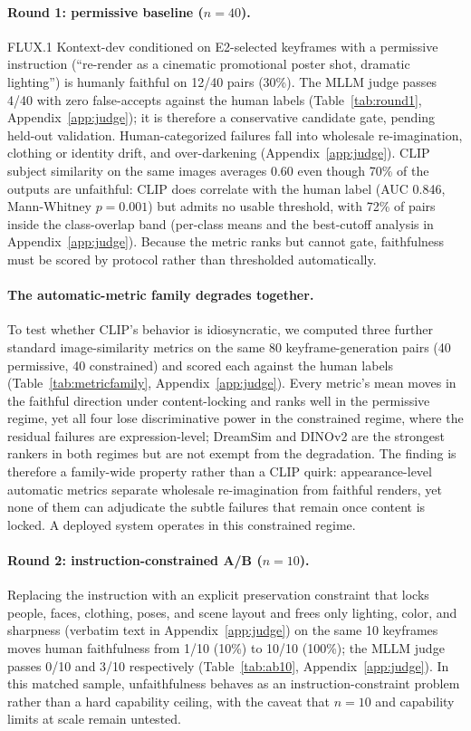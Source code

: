 \documentclass[10pt]{article}
\begin{document}
\paragraph{Round 1: permissive baseline ($n=40$).}
FLUX.1 Kontext-dev conditioned on E2-selected keyframes with a permissive instruction (``re-render as a cinematic promotional poster shot, dramatic lighting'') is humanly faithful on 12/40 pairs (30\%). The MLLM judge passes 4/40 with zero false-accepts against the human labels (Table~\ref{tab:round1}, Appendix~\ref{app:judge}); it is therefore a conservative candidate gate, pending held-out validation. Human-categorized failures fall into wholesale re-imagination, clothing or identity drift, and over-darkening (Appendix~\ref{app:judge}). CLIP subject similarity on the same images averages 0.60 even though 70\% of the outputs are unfaithful: CLIP does correlate with the human label (AUC 0.846, Mann-Whitney $p=0.001$) but admits no usable threshold, with 72\% of pairs inside the class-overlap band (per-class means and the best-cutoff analysis in Appendix~\ref{app:judge}). Because the metric ranks but cannot gate, faithfulness must be scored by protocol rather than thresholded automatically.

\paragraph{The automatic-metric family degrades together.}
To test whether CLIP's behavior is idiosyncratic, we computed three further standard image-similarity metrics on the same 80 keyframe-generation pairs (40 permissive, 40 constrained) and scored each against the human labels (Table~\ref{tab:metricfamily}, Appendix~\ref{app:judge}). Every metric's mean moves in the faithful direction under content-locking and ranks well in the permissive regime, yet all four lose discriminative power in the constrained regime, where the residual failures are expression-level; DreamSim and DINOv2 are the strongest rankers in both regimes but are not exempt from the degradation. The finding is therefore a family-wide property rather than a CLIP quirk: appearance-level automatic metrics separate wholesale re-imagination from faithful renders, yet none of them can adjudicate the subtle failures that remain once content is locked. A deployed system operates in this constrained regime.

\paragraph{Round 2: instruction-constrained A/B ($n=10$).}
Replacing the instruction with an explicit preservation constraint that locks people, faces, clothing, poses, and scene layout and frees only lighting, color, and sharpness (verbatim text in Appendix~\ref{app:judge}) on the same 10 keyframes moves human faithfulness from 1/10 (10\%) to 10/10 (100\%); the MLLM judge passes 0/10 and 3/10 respectively (Table~\ref{tab:ab10}, Appendix~\ref{app:judge}). In this matched sample, unfaithfulness behaves as an instruction-constraint problem rather than a hard capability ceiling, with the caveat that $n=10$ and capability limits at scale remain untested.
\end{document}
